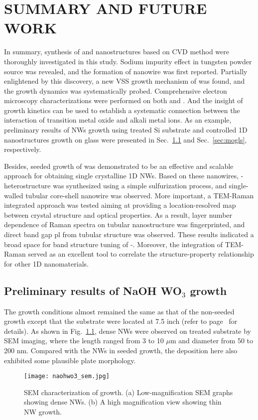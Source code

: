 \chapter{SUMMARY AND FUTURE WORK}

In summary, synthesis of  and  nanostructures based on CVD method were thoroughly investigated in this study. Sodium impurity effect in tungsten powder source was revealed, and the formation of  nanowire was first reported. Partially enlightened by this discovery, a new VSS growth mechanism of  was found, and the growth dynamics was systematically probed. Comprehensive electron microscopy characterizations were performed on both  and . And the insight of growth kinetics can be used to establish a systematic connection between the interaction of transition metal oxide and alkali metal ions. As an example, preliminary results of  NWs growth using  treated Si substrate and controlled  1D nanostructures growth on glass were presented in Sec.~\ref{sec:nawo} and Sec.~\ref{sec:mogls}, respectively.

Besides, seeded growth of  was demonstrated to be an effective and scalable approach for obtaining single crystalline 1D  NWs. Based on these  nanowires, - heterostructure was synthesized using a simple sulfurization process, and single-walled  tubular core-shell nanowire was observed. More important, a TEM-Raman integrated approach was tested aiming at providing a location-resolved map between crystal structure and optical properties. As a result, layer number dependence of Raman spectra on  tubular nanostructure was fingerprinted, and direct band gap \gls{pl} from  tubular structure was observed. These results indicated a broad space for band structure tuning of -. Moreover, the integration of TEM-Raman served as an excellent tool to correlate the structure-property relationship for other 1D nanomaterials.

\section{Preliminary results of NaOH WO$_3$ growth}\label{sec:nawo}
The growth conditions almost remained the same as that of the non-seeded  growth except that the substrate were located at 7.5 inch (refer to page~\pageref{sec:woxnonseed} for details). As shown in Fig.~\ref{fig:naohwsem}, dense NWs were observed on  treated substrate by SEM imaging, where the length ranged from 3 to 10 $\mu$m and diameter from 50 to 200 nm. Compared with the  NWs in seeded growth, the deposition here also exhibited some plausible plate morphology.
\begin{figure}[htb]
\centering
\texttt{[image: naohwo3\_sem.jpg]}
\caption[SEM characterization of   growth]{SEM characterization of   growth. (a) Low-magnification SEM graphs showing dense  NWs. (b) A high magnification view showing thin NW growth.}
\label{fig:naohwsem}
\end{figure}

